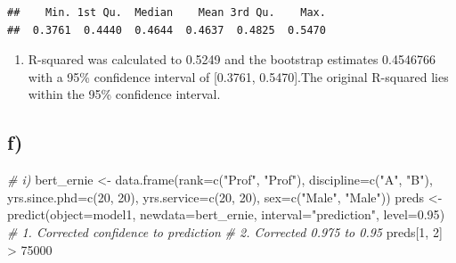 \documentclass[
]{article}
\newenvironment{Shaded}{\begin{snugshade}}{\end{snugshade}}
\newcommand{\AttributeTok}[1]{\textcolor[rgb]{0.77,0.63,0.00}{#1}}
\newcommand{\CommentTok}[1]{\textcolor[rgb]{0.56,0.35,0.01}{\textit{#1}}}
\newcommand{\DecValTok}[1]{\textcolor[rgb]{0.00,0.00,0.81}{#1}}
\newcommand{\FloatTok}[1]{\textcolor[rgb]{0.00,0.00,0.81}{#1}}
\newcommand{\FunctionTok}[1]{\textcolor[rgb]{0.00,0.00,0.00}{#1}}
\newcommand{\NormalTok}[1]{#1}
\newcommand{\OtherTok}[1]{\textcolor[rgb]{0.56,0.35,0.01}{#1}}
\newcommand{\SpecialCharTok}[1]{\textcolor[rgb]{0.00,0.00,0.00}{#1}}
\newcommand{\StringTok}[1]{\textcolor[rgb]{0.31,0.60,0.02}{#1}}
\providecommand{\tightlist}{%
  \setlength{\itemsep}{0pt}\setlength{\parskip}{0pt}}
\begin{document}
\begin{Shaded}
\end{Shaded}

\begin{verbatim}
##    Min. 1st Qu.  Median    Mean 3rd Qu.    Max. 
##  0.3761  0.4440  0.4644  0.4637  0.4825  0.5470
\end{verbatim}

\begin{enumerate}
\def\labelenumi{(\roman{enumi})}
\setcounter{enumi}{3}
\tightlist
\item
  R-squared was calculated to 0.5249 and the bootstrap estimates
  0.4546766 with a 95\% confidence interval of {[}0.3761, 0.5470{]}.The
  original R-squared lies within the 95\% confidence interval.
\end{enumerate}

\hypertarget{f-1}{%
\subsection{f)}\label{f-1}}

\begin{Shaded}
\begin{Highlighting}[]
\CommentTok{\# i)}
\NormalTok{bert\_ernie }\OtherTok{\textless{}{-}} \FunctionTok{data.frame}\NormalTok{(}\AttributeTok{rank=}\FunctionTok{c}\NormalTok{(}\StringTok{"Prof"}\NormalTok{, }\StringTok{"Prof"}\NormalTok{), }\AttributeTok{discipline=}\FunctionTok{c}\NormalTok{(}\StringTok{"A"}\NormalTok{, }\StringTok{"B"}\NormalTok{), }
                         \AttributeTok{yrs.since.phd=}\FunctionTok{c}\NormalTok{(}\DecValTok{20}\NormalTok{, }\DecValTok{20}\NormalTok{), }\AttributeTok{yrs.service=}\FunctionTok{c}\NormalTok{(}\DecValTok{20}\NormalTok{, }\DecValTok{20}\NormalTok{), }
                         \AttributeTok{sex=}\FunctionTok{c}\NormalTok{(}\StringTok{"Male"}\NormalTok{, }\StringTok{"Male"}\NormalTok{))}
\NormalTok{preds }\OtherTok{\textless{}{-}} \FunctionTok{predict}\NormalTok{(}\AttributeTok{object=}\NormalTok{model1, }\AttributeTok{newdata=}\NormalTok{bert\_ernie, }\AttributeTok{interval=}\StringTok{"prediction"}\NormalTok{, }\AttributeTok{level=}\FloatTok{0.95}\NormalTok{) }
\CommentTok{\# 1. Corrected confidence to prediction}
\CommentTok{\# 2. Corrected 0.975 to 0.95}
\NormalTok{preds[}\DecValTok{1}\NormalTok{, }\DecValTok{2}\NormalTok{] }\SpecialCharTok{\textgreater{}} \DecValTok{75000}
\end{Highlighting}
\end{Shaded}
\end{document}
